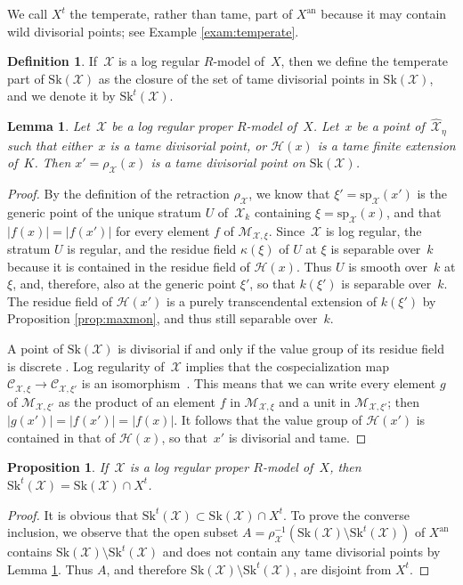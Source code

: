\documentclass[JEP,XML,SOM,Unicode,NoFloatCountersInSection]{cedram}
\let\mathcal\mathscr
\newtheorem{prop}[equation]{Proposition}
\newtheorem{lemma}[equation]{Lemma}
\theoremstyle{definition}
\newtheorem{definition}[equation]{Definition}
\numberwithin{equation}{subsection}
\newcommand{\cX}{\ensuremath{\mathscr{X}}}
\newcommand{\an}{\mathrm{an}}
\newcommand{\Sk}{\mathrm{Sk}}
\newcommand{\spe}{\mathrm{sp}}
\begin{document}
We call $X^t$ the temperate, rather than tame, part of $X^{\an}$ because it may contain wild divisorial points; see Example \ref{exam:temperate}.

\begin{definition}
If~$\cX$ is a log regular $R$\nobreakdash-model of~$X$, then we define the temperate part of $\Sk(\cX)$
as the closure of the set of tame divisorial points in $\Sk(\cX)$, and we denote it by $\Sk^t(\cX)$.
\end{definition}

\begin{lemma}\label{lemm:tameretract}
Let~$\cX$ be a log regular proper $R$\nobreakdash-model of~$X$. Let~$x$ be a point of~$\widehat{\cX}_\eta$ such that either~$x$ is a tame divisorial point, or $\mathscr{H}(x)$ is a tame finite extension of~$K$. Then $x'=\rho_{\cX}(x)$ is a tame divisorial point on $\Sk(\cX)$.
\end{lemma}
\begin{proof}
By the definition of the retraction $\rho_{\cX}$, we know that $\xi'=\spe_{\cX}(x')$ is the generic point of the unique stratum $U$ of~$\cX_k$ containing $\xi=\spe_{\cX}(x)$, and that $|f(x)|=|f(x')|$ for every element $f$ of
$\mathcal{M}_{\cX,\xi}$. Since~$\cX$ is log regular, the stratum $U$ is regular, and the residue field $\kappa(\xi)$ of $U$ at $\xi$ is separable over~$k$ because it is contained in the residue field of $\mathscr{H}(x)$. Thus $U$ is smooth over~$k$ at $\xi$, and, therefore, also at the generic point $\xi'$, so that $k(\xi')$ is separable over~$k$. The residue field of $\mathscr{H}(x')$ is a purely transcendental extension of $k(\xi')$ by Proposition \ref{prop:maxmon}, and thus still separable over~$k$.

A point of $\Sk(\cX)$ is divisorial if and only if the value group of its residue field is discrete \cite[2.4.8]{MuNi}. Log regularity of~$\cX$ implies that the cospecialization map $\mathcal{C}_{\cX,\xi}\to \mathcal{C}_{\cX,\xi'}$ is an isomorphism~\cite[3.2.1]{logzeta}. This means that we can write every element $g$ of $\mathcal{M}_{\cX,\xi'}$ as the product of an element $f$ in $\mathcal{M}_{\cX,\xi}$ and a unit in $\mathcal{M}_{\cX,\xi'}$; then $|g(x')|=|f(x')|=|f(x)|$. It follows that the value group of $\mathscr{H}(x')$ is contained in that of $\mathscr{H}(x)$, so that~$x'$ is divisorial and tame.
\end{proof}

\begin{prop}\label{prop:tamesk}
If~$\cX$ is a log regular proper $R$\nobreakdash-model of~$X$, then $\Sk^t(\cX)=\Sk(\cX)\cap X^t$.
\end{prop}
\begin{proof}
It is obvious that $\Sk^t(\cX)\subset \Sk(\cX)\cap X^t$.
To prove the converse inclusion, we observe that the open subset $A=\rho_{\cX}^{-1}(\Sk(\cX)\setminus \Sk^t(\cX))$ of $X^{\an}$ contains $\Sk(\cX)\setminus \Sk^t(\cX)$ and does not contain any tame divisorial points by Lemma \ref{lemm:tameretract}. Thus $A$, and therefore $\Sk(\cX)\setminus \Sk^t(\cX)$, are disjoint from $X^t$.
\end{proof}
\end{document}
